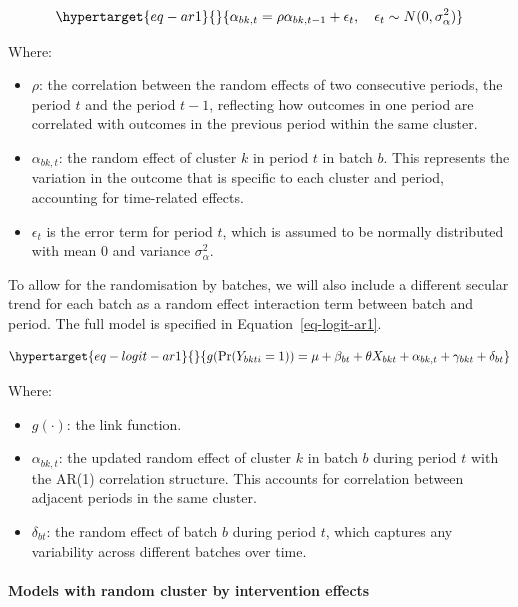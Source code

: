 \documentclass[
]{scrartcl}
\let\oldparagraph\paragraph
\renewcommand{\paragraph}[1]{\oldparagraph{#1}\mbox{}}
\providecommand{\tightlist}{%
  \setlength{\itemsep}{0pt}\setlength{\parskip}{0pt}}\usepackage{longtable,booktabs,array}
\begin{document}
\begin{equation}\protect\hypertarget{eq-ar1}{}{
\alpha_{bk, t} = \rho \alpha_{bk, t-1} + \epsilon_{t}, \quad \epsilon_{t} \sim N(0, \sigma^2_\alpha)
}\label{eq-ar1}\end{equation}

Where:

\begin{itemize}
\tightlist
\item
  \(\rho\): the correlation between the random effects of two
  consecutive periods, the period \(t\) and the period \(t-1\),
  reflecting how outcomes in one period are correlated with outcomes in
  the previous period within the same cluster.
\item
  \(\alpha_{bk, t}\): the random effect of cluster \(k\) in period \(t\)
  in batch \(b\). This represents the variation in the outcome that is
  specific to each cluster and period, accounting for time-related
  effects.
\item
  \(\epsilon_{t}\) is the error term for period \(t\), which is assumed
  to be normally distributed with mean 0 and variance
  \(\sigma^2_\alpha\).
\end{itemize}

To allow for the randomisation by batches, we will also include a
different secular trend for each batch as a random effect interaction
term between batch and period. The full model is specified in
Equation~\ref{eq-logit-ar1}.

\begin{equation}\protect\hypertarget{eq-logit-ar1}{}{
g(\text{Pr}(Y_{bkti} = 1)) = \mu + \beta_{bt} + \theta X_{bkt} + \alpha_{bk,t} + \gamma_{bkt} + \delta_{bt}
}\label{eq-logit-ar1}\end{equation}

Where:

\begin{itemize}
\tightlist
\item
  \(g(\cdot)\): the link function.
\item
  \(\alpha_{bk,t}\): the updated random effect of cluster \(k\) in batch
  \(b\) during period \(t\) with the AR(1) correlation structure. This
  accounts for correlation between adjacent periods in the same cluster.
\item
  \(\delta_{bt}\): the random effect of batch \(b\) during period \(t\),
  which captures any variability across different batches over time.
\end{itemize}

\hypertarget{models-with-random-cluster-by-intervention-effects}{%
\paragraph{Models with random cluster by intervention
effects}\label{models-with-random-cluster-by-intervention-effects}}
\end{document}
